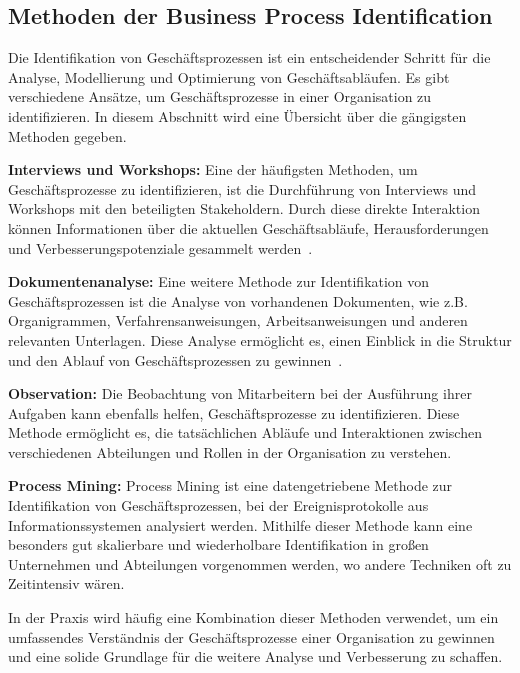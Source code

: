 \subsection{Methoden der Business Process Identification}

Die Identifikation von Geschäftsprozessen ist ein entscheidender Schritt für die Analyse, Modellierung und Optimierung von Geschäftsabläufen. Es gibt verschiedene Ansätze, um Geschäftsprozesse in einer Organisation zu identifizieren. In diesem Abschnitt wird eine Übersicht über die gängigsten Methoden gegeben.

\textbf{Interviews und Workshops:} Eine der häufigsten Methoden, um Geschäftsprozesse zu identifizieren, ist die Durchführung von Interviews und Workshops mit den beteiligten Stakeholdern. Durch diese direkte Interaktion können Informationen über die aktuellen Geschäftsabläufe, Herausforderungen und Verbesserungspotenziale gesammelt werden~\cite[5.2.2, 5.2.3]{Dumas2013}.

\textbf{Dokumentenanalyse:} Eine weitere Methode zur Identifikation von Geschäftsprozessen ist die Analyse von vorhandenen Dokumenten, wie z.B. Organigrammen, Verfahrensanweisungen, Arbeitsanweisungen und anderen relevanten Unterlagen. Diese Analyse ermöglicht es, einen Einblick in die Struktur und den Ablauf von Geschäftsprozessen zu gewinnen~\cite[5.2.1]{Dumas2013}.

\textbf{Observation:} Die Beobachtung von Mitarbeitern bei der Ausführung ihrer Aufgaben kann ebenfalls helfen, Geschäftsprozesse zu identifizieren. Diese Methode ermöglicht es, die tatsächlichen Abläufe und Interaktionen zwischen verschiedenen Abteilungen und Rollen in der Organisation zu verstehen.~\cite[5.2.1]{Dumas2013}

\textbf{Process Mining:} Process Mining ist eine datengetriebene Methode zur Identifikation von Geschäftsprozessen, bei der Ereignisprotokolle aus Informationssystemen analysiert werden. Mithilfe dieser Methode kann eine besonders gut skalierbare und wiederholbare Identifikation in großen Unternehmen und Abteilungen vorgenommen werden, wo andere Techniken oft zu Zeitintensiv wären.~\cite{Aalst2012}

In der Praxis wird häufig eine Kombination dieser Methoden verwendet, um ein umfassendes Verständnis der Geschäftsprozesse einer Organisation zu gewinnen und eine solide Grundlage für die weitere Analyse und Verbesserung zu schaffen.